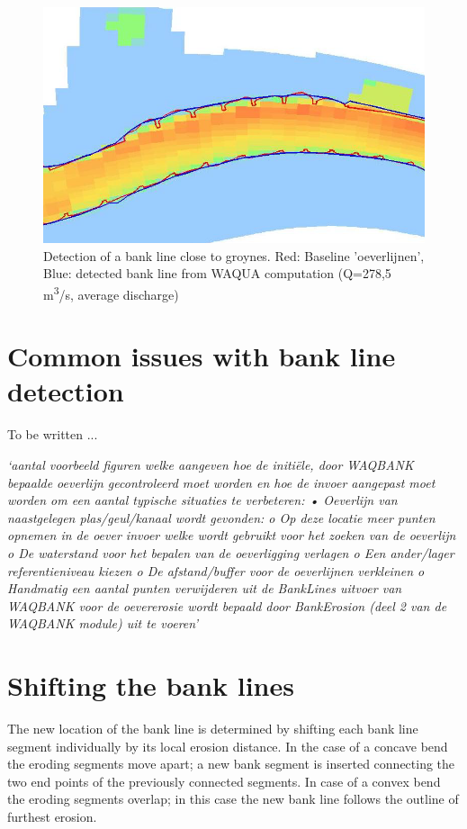 \begin{figure}
\includegraphics[width=\textwidth]{figures/Fig3-3.png}
\caption{Detection of a bank line close to groynes.
Red: Baseline 'oeverlijnen', Blue: detected bank line from WAQUA computation (Q=278,5 m\textsuperscript{3}/s, average discharge)}
\label{Fig3.3}
\end{figure}

\section{Common issues with bank line detection} \label{Sec:DetectIssues}

To be written ...

\emph{`aantal voorbeeld figuren welke aangeven hoe de initi\"ele, door WAQBANK bepaalde oeverlijn gecontroleerd moet worden en hoe de invoer aangepast moet worden om een aantal typische situaties te verbeteren:
•	Oeverlijn van naastgelegen plas/geul/kanaal wordt gevonden: 
o	Op deze locatie meer punten opnemen in de oever invoer welke wordt gebruikt voor het zoeken van de oeverlijn
o	De waterstand voor het bepalen van de oeverligging verlagen
o	Een ander/lager referentieniveau kiezen
o	De afstand/buffer voor de oeverlijnen verkleinen
o	Handmatig een aantal punten verwijderen uit de BankLines uitvoer van WAQBANK voor de oevererosie wordt bepaald door BankErosion (deel 2 van de WAQBANK module) uit te voeren'}

\section{Shifting the bank lines} \label{Sec:BankShift}

The new location of the bank line is determined by shifting each bank line segment individually by its local erosion distance.
In the case of a concave bend the eroding segments move apart; a new bank segment is inserted connecting the two end points of the previously connected segments.
In case of a convex bend the eroding segments overlap; in this case the new bank line follows the outline of furthest erosion.

